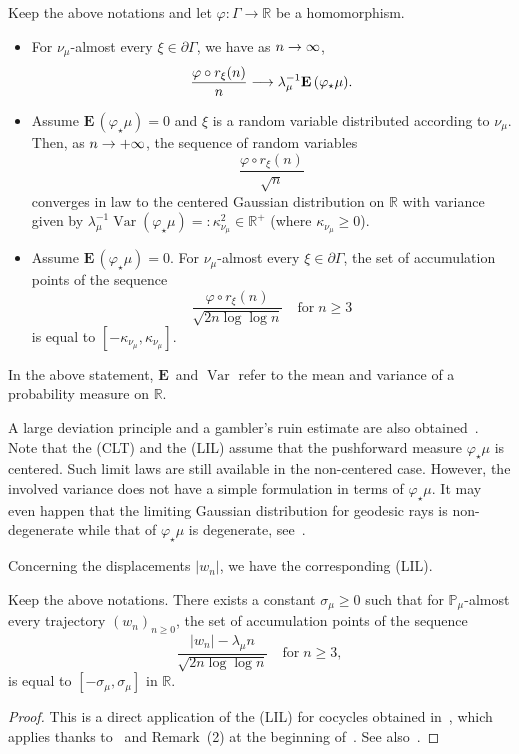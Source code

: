 \documentclass[AHL,Unicode,longabstracts,published]{cedram}
\DeclareMathOperator{\Var}{Var}
\newcommand{\R}{\mathbb{R}}
\renewcommand{\Pr}{\mathbb{P}}
\newcommand{\Eb}{\mathbf{E}\,}
\renewcommand{\(}{\left(}
\renewcommand{\)}{\right)}
\renewcommand*{\to}{\mathchoice{\longrightarrow}{\rightarrow}{\rightarrow}{\rightarrow}}
\begin{document}
\begin{theo}\label{Thm:Benard}
Keep the above notations and let $\varphi : \Gamma \rightarrow \R$ be a homomorphism.
\begin{itemize}
\item[(LLN)] For $\nu_\mu$-almost every $\xi \in \partial \Gamma$, we have as $n \to \infty$,
\[
\frac{\varphi \circ r_\xi(n)}{n} \to \lambda_{\mu}^{-1}\Eb(\varphi_{\star}\mu).
\]
\item[(CLT)] Assume $\Eb(\varphi_{\star}\mu)=0$ and $\xi$ is a random variable distributed according to $\nu_\mu$. Then, as $n \to +\infty$, the sequence of random variables
\[
\frac{\varphi\circ r_\xi(n)}{\sqrt{n}}
\]
converges in law to the centered Gaussian distribution on $\R$ with variance given by $\lambda_{\mu}^{-1}\Var(\varphi_{\star}\mu)=:\kappa^2_{\nu_\mu}\in \R^+$ (where $\kappa_{\nu_\mu}\geq 0$).

\item[(LIL)] Assume $\Eb(\varphi_{\star}\mu)=0$. For $\nu_\mu$-almost every $\xi \in \partial \Gamma$, the set of accumulation points of the sequence
\[
\frac{\varphi\circ r_\xi(n)}{\sqrt{2n\log \log n}} \quad \text{for}\; n\geq 3
\]
is equal to $[-\kappa_{\nu_\mu}, \kappa_{\nu_\mu}]$.
\end{itemize}
\end{theo}

In the above statement, $\Eb$ and $\Var$ refer to the mean and variance of a probability measure on $\R$.

A large deviation principle and a gambler's ruin estimate are also obtained~\cite[Theorem~1.4]{BenardWinding}. Note that the (CLT) and the (LIL) assume that the pushforward measure $\varphi_{\star}\mu$ is centered. Such limit laws are still available in the non-centered case. However, the involved variance does not have a simple formulation in terms of $\varphi_{\star}\mu$. It may even happen that the limiting Gaussian distribution for geodesic rays is non-degenerate while that of $\varphi_{\star}\mu$ is degenerate, see~\cite[Lemma~4.2]{BenardWinding}.


Concerning the displacements $|w_n|$, we have the corresponding (LIL).

\begin{prop}\label{Prop:LILdistance}
Keep the above notations.
There exists a constant $\sigma_\mu\ge 0$ such that for $\Pr_{\mu}$-almost every trajectory $(w_n)_{n\geq 0}$, the set of accumulation points of the sequence
\[
\frac{|w_n|-\lambda_\mu n}{\sqrt{2n\log \log n}} \quad \text{for}\; n\geq 3,
\]
is equal to $[-\sigma_\mu, \sigma_\mu]$ in $\R$.
\end{prop}
\begin{proof}
This is a direct application of the (LIL) for cocycles obtained in~\cite[Proposition~A.5]{BenardWinding}, which applies thanks to~\cite[Section~3.1]{BenardWinding} and Remark~(2) at the beginning of~\cite[Appendix~A]{BenardWinding}. See also~\cite{BjorklundCLT, BenoistQuintCLThyperbolic, ChoiCLT}.
\end{proof}
\end{document}
